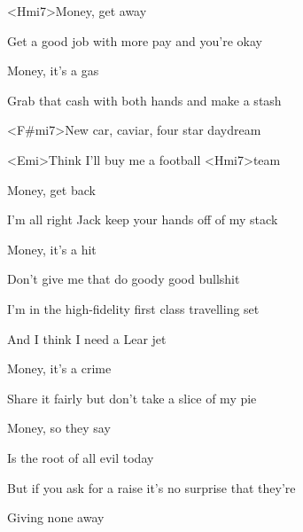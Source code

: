 
\zs
<Hmi7>Money, get away

Get a good job with more pay and you're okay

Money, it's a gas

Grab that cash with both hands and make a stash
\ks

\zr
<F#mi7>New car, caviar, four star daydream

<Emi>Think I'll buy me a football <Hmi7>team
\kr

\zs
Money, get back

I'm all right Jack keep your hands off of my stack

Money, it's a hit

Don't give me that do goody good bullshit
\ks

\zr
I'm in the high-fidelity first class travelling set

And I think I need a Lear jet
\kr

\zs
Money, it's a crime

Share it fairly but don't take a slice of my pie

Money, so they say

Is the root of all evil today
\ks

\zr
But if you ask for a raise it's no surprise that they're

Giving none away
\kr

\kp
